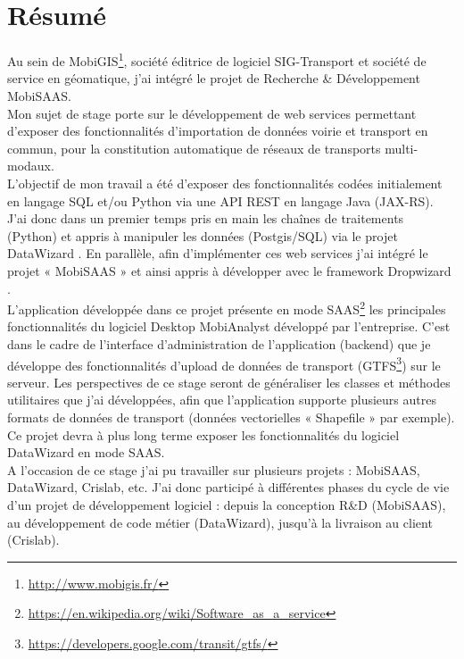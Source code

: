 \chapter*{Résumé}\label{Resume}

Au sein de MobiGIS\footnote{\url{http://www.mobigis.fr/}}, société éditrice de logiciel SIG-Transport et société de service en géomatique, j'ai intégré le projet de Recherche \& Développement \og MobiSAAS\fg.\\

Mon sujet de stage porte sur le développement de web services permettant d'exposer des fonctionnalités d'importation de données voirie et transport en commun, pour la constitution automatique de réseaux de transports multi-modaux. \\

L'objectif de mon travail a été d'exposer des fonctionnalités codées initialement en langage SQL et/ou Python via une API REST en langage Java (JAX-RS). J'ai donc dans un premier temps pris en main les chaînes de traitements (Python) et appris à manipuler les données (Postgis/SQL) via le projet \og DataWizard \fg. En parallèle, afin d'implémenter ces web services j'ai intégré le projet « MobiSAAS » et ainsi appris à développer avec le framework \og Dropwizard \fg. \\

L'application développée dans ce projet présente en mode SAAS\footnote{\url{https://en.wikipedia.org/wiki/Software_as_a_service}} les principales fonctionnalités du logiciel Desktop MobiAnalyst développé par l'entreprise. C'est dans le cadre de l'interface d'administration de l'application (backend) que je développe des fonctionnalités d'upload de données de transport (GTFS\footnote{\url{https://developers.google.com/transit/gtfs/}}) sur le serveur. Les perspectives de ce stage seront de généraliser les classes et méthodes utilitaires que j'ai développées, afin que l'application supporte plusieurs autres formats de données de transport (données vectorielles « Shapefile » par exemple). Ce projet devra à plus long terme exposer les fonctionnalités du logiciel DataWizard en mode SAAS.\\

A l'occasion de ce stage j'ai pu travailler sur plusieurs projets : MobiSAAS, DataWizard, Crislab, etc. J'ai donc participé à différentes phases du cycle de vie d'un projet de développement logiciel : depuis la conception R\&D (MobiSAAS), au développement de code métier (DataWizard), jusqu'à la livraison au client (Crislab).\\